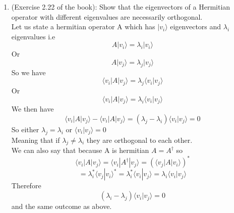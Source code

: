 \documentclass[12pt]{article}
\newcommand{\ket}[1]{\vert{#1}\rangle}
\newcommand{\bra}[1]{\langle{#1}\vert}
\begin{document}
\begin{enumerate}
\item (Exercise 2.22 of the book): Show that the eigenvectors of a Hermitian operator with different eigenvalues are necessarily orthogonal.
\\
Let us state a hermitian operator A which has $\ket{v_i}$ eigenvectors and $\lambda_i$ eigenvalues i.e 
$$ A \ket{v_i} = \lambda_i \ket{v_i} $$
Or 
$$ A \ket{v_j} = \lambda_j \ket{v_j} $$
So we have 
$$ \bra{v_i} A \ket{v_j} = \lambda_j \langle v_i | v_j \rangle $$
Or 
$$ \bra{v_i} A \ket{v_j} = \lambda_i \langle v_i | v_j \rangle $$
We then have 
$$ \langle v_i | A | v_j \rangle - \langle v_i|A|v_j \rangle = (\lambda_j  - \lambda_i) \langle v_i|v_j \rangle =0 $$
So either $\lambda_j = \lambda_i$ or $ \langle v_i | v_j \rangle =0$
\\
Meaning that if $\lambda_j \neq \lambda_i$ they are orthogonal to each other. 
\\
We can also say that because A is hermitian $A=A^\dagger$ so 
$$ \langle v_i | A | v_j \rangle = \langle v_i | A^\dagger | v_j \rangle = (\langle v_j | A | v_i \rangle)^* $$
$$ = \lambda_i^* \langle v_j | v_i \rangle^* = \lambda_i^* \langle v_i | v_j \rangle = \lambda_i \langle v_i | v_j \rangle $$
Therefore 
$$ (\lambda_i - \lambda_j)\langle v_i | v_j \rangle = 0 $$
and the same outcome as above.



\end{enumerate}
\end{document}
